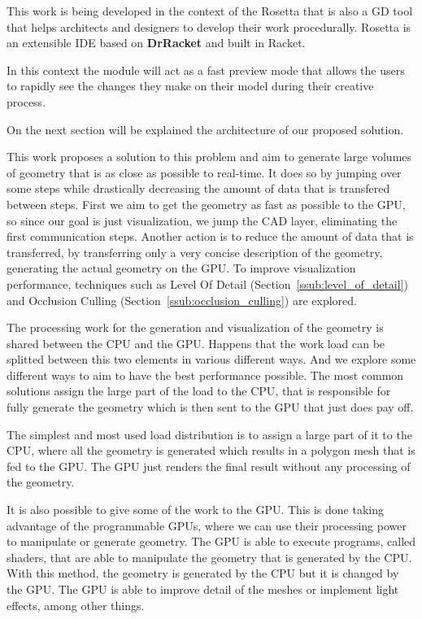 This work is being developed in the context of the Rosetta that is also a GD tool that helps architects and designers to develop their work procedurally. Rosetta is an extensible IDE based on \textbf{DrRacket} and built in Racket. 

In this context the module will act as a fast preview mode that allows the users to rapidly see the changes they make on their model during their creative process.

On the next section will be explained the architecture of our proposed solution.

This work proposes a solution to this problem and aim to generate large volumes of geometry that is as close as possible to real-time. It does so by jumping over some steps while drastically decreasing the amount of data that is transfered between steps. First we aim to get the geometry as fast as possible to the GPU, so since our goal is just visualization, we jump the CAD layer, eliminating the first communication steps. Another action is to reduce the amount of data that is transferred, by transferring only a very concise description of the geometry, generating the actual geometry on the GPU.
To improve visualization performance, techniques such as Level Of Detail (Section~\ref{ssub:level_of_detail}) and Occlusion Culling (Section~\ref{ssub:occlusion_culling}) are explored.

The processing work for the generation and visualization of the geometry is shared between the \gls{CPU} and the \gls{GPU}. Happens that the work load can be splitted between this two elements in various different ways. And we explore some different ways to aim to have the best performance possible.
The most common solutions assign the large part of the load to the \gls{CPU}, that is responsible for fully generate the geometry which is then sent to the \gls{GPU} that just does pay off.

The simplest and most used load distribution is to assign a large part of it to the \gls{CPU}, where all the geometry is generated which results in a polygon mesh that is fed to the \gls{GPU}. The \gls{GPU} just renders the final result without any processing of the geometry.

It is also possible to give some of the work to the \gls{GPU}. This is done taking advantage of the programmable \gls{GPU}s, where we can use their processing power to manipulate or generate geometry. The \gls{GPU} is able to execute programs, called shaders, that are able to manipulate the geometry that is generated by the \gls{CPU}. With this method, the geometry is generated by the \gls{CPU} but it is changed by the \gls{GPU}. The \gls{GPU} is able to improve detail of the meshes or implement light effects, among other things.

